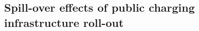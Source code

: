 \documentclass[preprint,review,11pt, authoryear]{elsarticle}
\begin{document}
    
    
    


    \subsection{Spill-over effects of public charging infrastructure roll-out}
\end{document}
